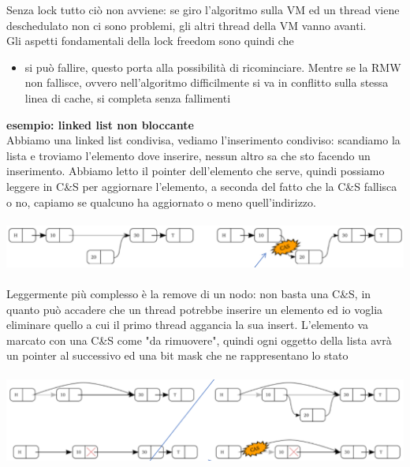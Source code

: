 \documentclass[12pt, oneside]{extbook}
\begin{document}
Senza lock tutto ciò non avviene: se giro l'algoritmo sulla VM ed un thread viene deschedulato non ci sono problemi, gli altri thread della VM vanno avanti.\\ Gli aspetti fondamentali della lock freedom sono quindi che
\begin{itemize}
\item si può fallire, questo porta alla possibilità di ricominciare. Mentre se la RMW non fallisce, ovvero nell'algoritmo difficilmente si va in conflitto sulla stessa linea di cache, si completa senza fallimenti
\end{itemize}
\textbf{esempio: linked list non bloccante}\\
Abbiamo una linked list condivisa, vediamo l'inserimento condiviso: scandiamo la lista e troviamo l'elemento dove inserire, nessun altro sa che sto facendo un inserimento. Abbiamo letto il pointer dell'elemento che serve, quindi possiamo leggere in C\&S per aggiornare l'elemento, a seconda del fatto che la C\&S fallisca o no, capiamo se qualcuno ha aggiornato o meno quell'indirizzo.\\\\
\includegraphics[scale=0.3]{immagini/cas_insert}
\\\\Leggermente più complesso è la remove di un nodo: non basta una C\&S, in quanto può accadere che un thread potrebbe inserire un elemento ed io voglia eliminare quello a cui il primo thread aggancia la sua insert. L'elemento va marcato con una C\&S come "da rimuovere", quindi ogni oggetto della lista avrà un pointer al successivo ed una bit mask che ne rappresentano lo stato\\\\
\includegraphics[scale=0.3]{immagini/cas_delete}\\\\
\end{document}
